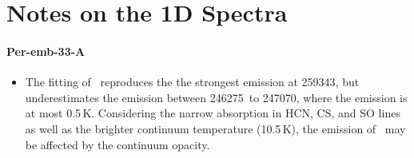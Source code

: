 \section{Notes on the 1D Spectra}

\paragraph{Per-emb-33-A}
\begin{itemize}
    \item The fitting of \methylformate\ reproduces the the strongest emission at 259343\mhz, but underestimates the emission between 246275\mhz\ to 247070\mhz, where the emission is at most 0.5\,K.  Considering the narrow absorption in HCN, CS, and SO lines as well as the brighter continuum temperature (10.5\,K), the emission of \methylformate\ may be affected by the continuum opacity.
\end{itemize}



